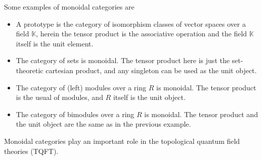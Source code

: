 \documentclass[12pt]{article}
\begin{document}
Some examples of monoidal categories are
\begin{itemize}
\item
A prototype is the category of isomorphism classes of vector spaces over a field $\mathbb{K}$, herein the tensor product is the associative operation and the field $\mathbb{K}$ itself is the unit element.
\item
The category of sets is monoidal.  The tensor product here is just the set-theoretic cartesian product, and any singleton can be used as the unit object.
\item
The category of (left) modules over a ring $R$ is monoidal.  The tensor product is the usual  of modules, and $R$ itself is the unit object.
\item
The category of bimodules over a ring $R$ is monoidal.  The tensor product and the unit object are the same as in the previous example.
\end{itemize}

Monoidal categories play an important role in the topological quantum field theories (TQFT).

\end{document}
